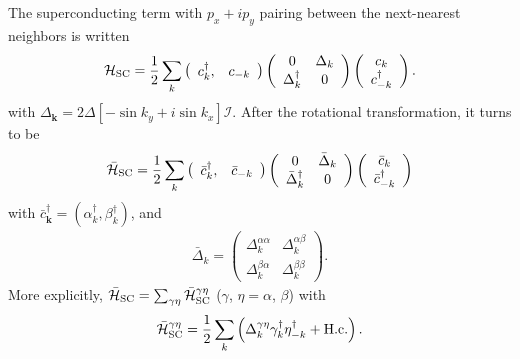 \documentclass[12pt]{iopart}
\begin{document}
\bigskip
The superconducting term with $p_{x}+ip_{y}$ pairing between the next-nearest neighbors is written%
\begin{eqnarray}
\mathcal{H}_{\rm SC}=\frac{1}{2}\sum_{k}\left(\begin{array}{cc}
                            c_{k}^{\dag}, & c_{-k}
                          \end{array}\right) \left(
\begin{array}{cc}
0 & \Delta _{k} \\
\Delta _{k}^{\dagger} & 0%
\end{array}%
\right) \left(
\begin{array}{c}
c_{k} \\
c_{-k}^{\dagger}%
\end{array}%
\right) .
\end{eqnarray}%
with $\Delta_{\bm{k}}=2\Delta[-\sin k_{y}+i\sin k_{x}]\mathcal{I}$.
After the rotational transformation, it turns to be %
\begin{eqnarray}
\bar{\mathcal{H}}_{\rm SC}=\frac{1}{2}\sum_{k}\left(\begin{array}{cc}
                            \bar{c}_{k}^{\dag}, & \bar{c}_{-k}
                          \end{array}\right) \left(
\begin{array}{cc}
0 & \bar{\Delta}_{k} \\
\bar{\Delta}_{k}^{\dagger} & 0%
\end{array}%
\right) \left(
\begin{array}{c}
\bar{c}_{k} \\
\bar{c}_{-k}^{\dagger}%
\end{array}%
\right)
\end{eqnarray}%
with $\bar{c}_{\bm{k}}^{\dag}=(\alpha_{k}^{\dag}, \beta_{k}^{\dag})$, and
\begin{eqnarray}
\bar{\Delta}_{k}=\left(
\begin{array}{cc}
\Delta _{k}^{\alpha\alpha} & \Delta _{k}^{\alpha\beta} \\
\Delta _{k}^{\beta\alpha} & \Delta _{k}^{\beta\beta} %
\end{array}%
\right).
\end{eqnarray}
More explicitly, $\bar{\mathcal{H}}_{\rm SC}=\sum_{\gamma\eta}\bar{\mathcal{H}}_{\rm SC}^{\gamma\eta}$ ($\gamma$, $\eta=\alpha$, $\beta$) with
\begin{equation}
\bar{\mathcal{H}}_{\rm SC}^{\gamma\eta}=\frac{1}{2}\sum_{k}\left( \Delta _{k}^{\gamma\eta}\gamma_{k}^{\dag }\eta_{-k}^{\dag }+{\rm H.c.}\right).
\end{equation}%
\end{document}
